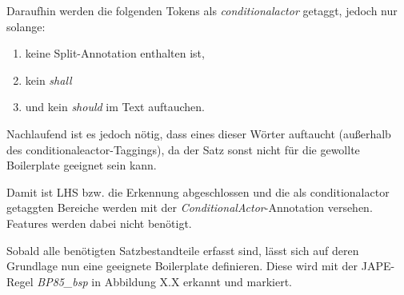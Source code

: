 \documentclass[12pt]{report}
\begin{document}
Daraufhin werden die folgenden Tokens als \textit{conditionalactor} getaggt, jedoch nur solange:
\begin{enumerate}
\item keine Split-Annotation enthalten ist,
\item kein \textit{shall}
\item und kein \textit{should} im Text auftauchen.
\end{enumerate}

Nachlaufend ist es jedoch nötig, dass eines dieser Wörter auftaucht (außerhalb des conditionaleactor-Taggings), da der Satz sonst nicht für die gewollte Boilerplate geeignet sein kann.

Damit ist LHS bzw. die Erkennung abgeschlossen und die als conditionalactor getaggten Bereiche werden mit der \textit{ConditionalActor}-Annotation versehen. Features werden dabei nicht benötigt. 

Sobald alle benötigten Satzbestandteile erfasst sind, lässt sich auf deren Grundlage nun eine geeignete Boilerplate definieren. Diese wird mit der JAPE-Regel \textit{BP85\_bsp} in Abbildung X.X erkannt und markiert. 
\end{document}
